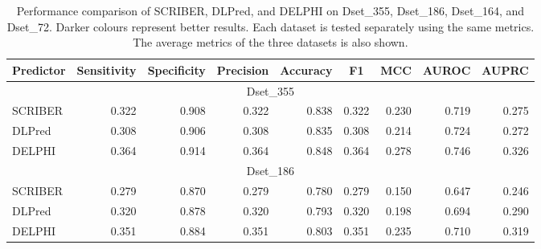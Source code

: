 \begin{table}
  \centering
  \caption{Performance comparison of SCRIBER, DLPred, and DELPHI on Dset\_355, Dset\_186, Dset\_164, and Dset\_72. Darker colours represent better results. Each dataset is tested separately using the same metrics. The average metrics of the three datasets is also shown.}
    \begin{tabular}{|lrrrrrrrr|}
    \toprule
    Predictor & \multicolumn{1}{c}{Sensitivity} & \multicolumn{1}{c}{Specificity} & \multicolumn{1}{c}{Precision} & \multicolumn{1}{c}{Accuracy} & \multicolumn{1}{c}{F1} & \multicolumn{1}{c}{MCC} & \multicolumn{1}{c}{AUROC} & \multicolumn{1}{c|}{AUPRC} \\
    \midrule
    \multicolumn{9}{|c|}{Dset\_355} \\
    \midrule
    SCRIBER & \cellcolor[rgb]{ .835,  .882,  .808}0.322 & \cellcolor[rgb]{ .847,  .886,  .816}0.908 & \cellcolor[rgb]{ .839,  .882,  .808}0.322 & \cellcolor[rgb]{ .847,  .89,  .82}0.838 & \cellcolor[rgb]{ .839,  .882,  .808}0.322 & \cellcolor[rgb]{ .839,  .882,  .808}0.230 & 0.719 & \cellcolor[rgb]{ .961,  .973,  .953}0.275 \\
    DLPred & 0.308 & 0.906 & 0.308 & 0.835 & 0.308 & 0.214 & \cellcolor[rgb]{ .89,  .922,  .871}0.724 & 0.272 \\
    DELPHI & \cellcolor[rgb]{ .329,  .51,  .208}0.364 & \cellcolor[rgb]{ .329,  .51,  .208}0.914 & \cellcolor[rgb]{ .329,  .51,  .208}0.364 & \cellcolor[rgb]{ .329,  .51,  .208}0.848 & \cellcolor[rgb]{ .329,  .51,  .208}0.364 & \cellcolor[rgb]{ .329,  .51,  .208}0.278 & \cellcolor[rgb]{ .329,  .51,  .208}0.746 & \cellcolor[rgb]{ .329,  .51,  .208}0.326 \\
    \midrule
    \multicolumn{9}{|c|}{Dset\_186} \\
    \midrule
    SCRIBER & 0.279 & 0.870 & 0.279 & 0.780 & 0.279 & 0.150 & 0.647 & 0.246 \\
    DLPred & \cellcolor[rgb]{ .62,  .722,  .549}0.320 & \cellcolor[rgb]{ .631,  .729,  .565}0.878 & \cellcolor[rgb]{ .62,  .722,  .549}0.320 & \cellcolor[rgb]{ .631,  .729,  .561}0.793 & \cellcolor[rgb]{ .62,  .722,  .549}0.320 & \cellcolor[rgb]{ .62,  .722,  .553}0.198 & \cellcolor[rgb]{ .498,  .631,  .404}0.694 & \cellcolor[rgb]{ .6,  .71,  .529}0.290 \\
    DELPHI & \cellcolor[rgb]{ .329,  .51,  .208}0.351 & \cellcolor[rgb]{ .329,  .51,  .208}0.884 & \cellcolor[rgb]{ .329,  .51,  .208}0.351 & \cellcolor[rgb]{ .329,  .51,  .208}0.803 & \cellcolor[rgb]{ .329,  .51,  .208}0.351 & \cellcolor[rgb]{ .329,  .51,  .208}0.235 & \cellcolor[rgb]{ .329,  .51,  .208}0.710 & \cellcolor[rgb]{ .329,  .51,  .208}0.319 \\

\end{tabular}
\end{table}
